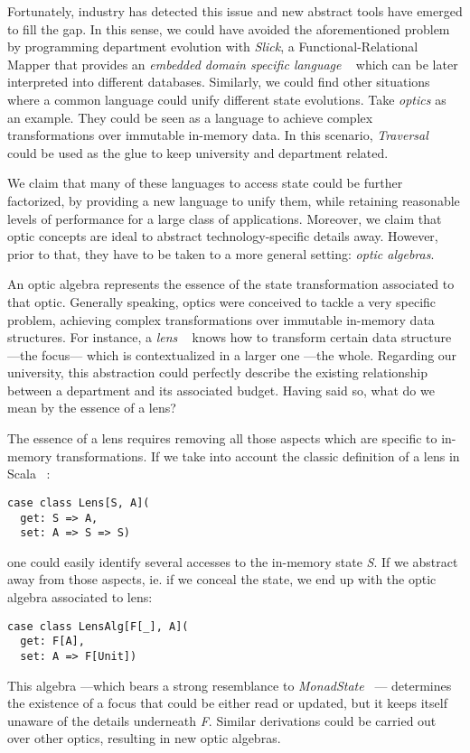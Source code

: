 \documentclass{article}
\begin{document}
Fortunately, industry has detected this issue and new abstract tools have
emerged to fill the gap. In this sense, we could have avoided the aforementioned
problem by programming department evolution with \emph{Slick}, a
Functional-Relational Mapper that provides an \emph{embedded domain specific
language} ~\cite{hudak1996building} which can be later interpreted into
different databases. Similarly, we could find other situations where a common
language could unify different state evolutions. Take \emph{optics} as an
example. They could be seen as a language to achieve complex transformations
over immutable in-memory data. In this scenario, \emph{Traversal}
~\cite{o2011functor} could be used as the glue to keep university and department
related.

We claim that many of these languages to access state could be further
factorized, by providing a new language to unify them, while retaining
reasonable levels of performance for a large class of applications. Moreover, we
claim that optic concepts are ideal to abstract technology-specific details
away. However, prior to that, they have to be taken to a more general setting:
\emph{optic algebras}.


An optic algebra represents the essence of the state transformation associated
to that optic. Generally speaking, optics were conceived to tackle a very
specific problem, achieving complex transformations over immutable in-memory
data structures. For instance, a \emph{lens} ~\cite{foster2005combinators} knows
how to transform certain data structure ---the focus--- which is contextualized
in a larger one ---the whole. Regarding our university, this abstraction could
perfectly describe the existing relationship between a department and its
associated budget. Having said so, what do we mean by the essence of a lens?

The essence of a lens requires removing all those aspects which are specific to
in-memory transformations. If we take into account the classic definition of a
lens in Scala ~\cite{morris2012asymmetric}:
\begin{lstlisting}
case class Lens[S, A](
  get: S => A,
  set: A => S => S)
\end{lstlisting}
one could easily identify several accesses to the in-memory state \emph{S}. If
we abstract away from those aspects, ie. if we conceal the state, we end up with
the optic algebra associated to lens:
\begin{lstlisting}
case class LensAlg[F[_], A](
  get: F[A],
  set: A => F[Unit])
\end{lstlisting}
This algebra ---which bears a strong resemblance to \emph{MonadState}
~\cite{gibbons2012unifying}--- determines the existence of a focus that could be
either read or updated, but it keeps itself unaware of the details underneath
\emph{F}. Similar derivations could be carried out over other optics, resulting
in new optic algebras.
\end{document}
